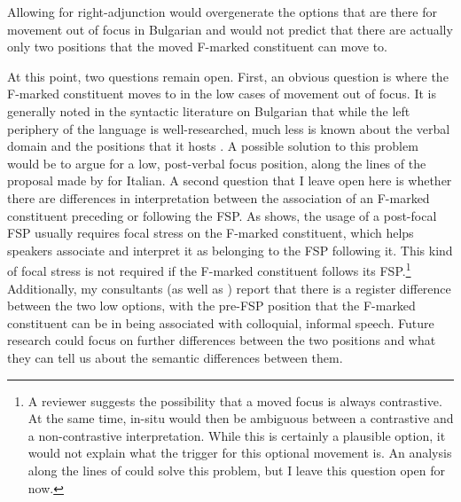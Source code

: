 \documentclass[output=paper,colorlinks,citecolor=brown]{langscibook}
\begin{document}
\noindent Allowing for right-adjunction would overgenerate the options that are there for movement out of focus in Bulgarian and would not predict that there are actually only two positions that the moved F-marked constituent can move to. \par 
At this point, two questions remain open. First, an obvious question is where the F-marked constituent moves to in the low cases of movement out of focus. It is generally noted in the syntactic literature on Bulgarian that while the left periphery of the language is well-researched, much less is known about the verbal domain and the positions that it hosts \citep{Krapova2002}. A possible solution to this problem would be to argue for a low, post-verbal focus position, along the lines of the proposal made by \citet{spe:Belletti2004} for Italian. A second question that I leave open here is whether there are differences in interpretation between the association of an F-marked constituent preceding or following the FSP. As  shows, the usage of a post-focal FSP usually requires focal stress on the F-marked constituent, which helps speakers associate and interpret it as belonging to the FSP following it. This kind of focal stress is not required if the F-marked constituent follows its FSP.\footnote{A reviewer suggests the possibility that a moved focus is always contrastive. At the same time, in-situ would then be ambiguous between a contrastive and a non-contrastive interpretation. While this is certainly a plausible option, it would not explain what the trigger for this optional movement is. An analysis along the lines of \citet{Titov2020} could solve this problem, but I leave this question open for now.} Additionally, my consultants (as well as \citealt{Nicolova2000}) report that there is a register difference between the two low options, with the pre-FSP position that the F-marked constituent can be in being associated with colloquial, informal speech. Future research could focus on further differences between the two positions and what they can tell us about the semantic differences between them. 
\end{document}

